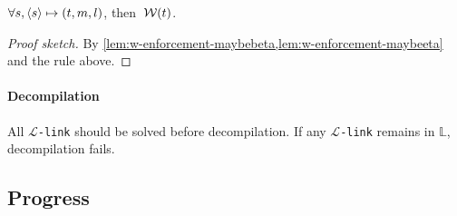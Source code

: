 \documentclass[sigconf,natbib=false,review]{acmart}
\newcommand{\llambda}{\ensuremath{\mathcal{L}}\xspace}
\newcommand{\linkMacro}[1]{\ensuremath{#1}\texttt{-link}\xspace}
\newcommand{\linkbeta}{\linkMacro{\llambda}}
\newcommand{\rhs}{rhs\xspace}
\newcommand{\linkStore}{\texorpdfstring{\ensuremath{\mathbb{L}}\xspace}{L}}
\begin{document}




\begin{lemma}\label{lem:w-enforcement-maybellam}
  $\forall s, \langle s \rangle\mapsto(t,m,l)$, then $\:\mathcal{W}(t)$.
\end{lemma}

\begin{proof}[Proof sketch]
  By \cref{lem:w-enforcement-maybebeta,lem:w-enforcement-maybeeta} and the 
  rule above.
\end{proof}


\paragraph{Decompilation}
All \linkbeta should be solved before decompilation.
If any \linkbeta remains in \linkStore, decompilation fails.

\subsection{Progress}

\newcommand{\progBetaLL}{\emph{\llambda-progress-refine}\xspace}
\newcommand{\progBetaRH}{\emph{\llambda-progress-\rhs}\xspace}
\newcommand{\progBetaFail}{\emph{\llambda-progress-fail}\xspace}
\end{document}
